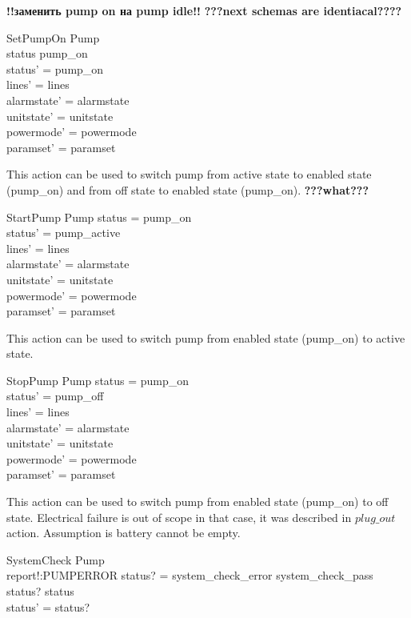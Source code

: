 \documentclass{article}
\begin{document}
\textbf{!!заменить pump on на pump idle!!}
\textbf{???next schemas are identiacal????}
	\begin{schema}{SetPumpOn}
		\Delta Pump \\
	\where 
		status \neq pump\_on \\
		status' = pump\_on \\
		lines' = lines \\
    	alarmstate' = alarmstate \\
    	unitstate' = unitstate \\
    	powermode' = powermode \\
		paramset' = paramset
	\end{schema}
	
	This action can be used to switch pump from active state to enabled state (pump\_on) and from off state to enabled state (pump\_on).
	\textbf{???what???}
	
	\begin{schema}{StartPump}
		\Delta Pump
	\where
		status = pump\_on \\ 
		status' = pump\_active \\
		lines' = lines  \\
    	alarmstate' = alarmstate \\
    	unitstate' = unitstate \\
    	powermode' = powermode \\
		paramset' = paramset
	\end{schema}
	
	This action can be used to switch pump from enabled state (pump\_on) to active state.
	
	\begin{schema}{StopPump}
		\Delta Pump
	\where
		status = pump\_on \\ 
		status' = pump\_off \\
		lines' = lines  \\
    	alarmstate' = alarmstate \\
    	unitstate' = unitstate \\
    	powermode' = powermode \\
		paramset' = paramset
	\end{schema}	
			
	This action can be used to switch pump from enabled state (pump\_on) to off state. Electrical failure is out of scope in that case, it was described 
	in $plug\_out$ action. Assumption is battery cannot be empty.		
			
	\begin{schema}{SystemCheck}
		\Delta Pump\\
		report!:PUMPERROR
	\where 
		status? = system\_check\_error \lor system\_check\_pass \\
		status? \neq status\\
		status' = status?
	\end{schema}
	
\end{document}
